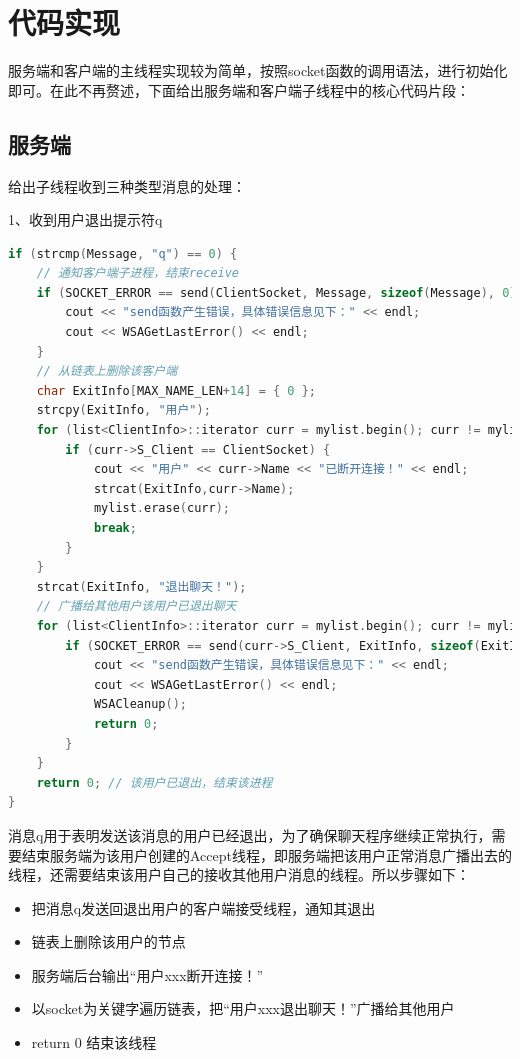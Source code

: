 \documentclass[UTF8,a4paper,10pt]{ctexart}
\begin{document}
\section{代码实现}
服务端和客户端的主线程实现较为简单，按照socket函数的调用语法，进行初始化即可。在此不再赘述，下面给出服务端和客户端子线程中的核心代码片段：
\subsection{服务端}
给出子线程收到三种类型消息的处理：\par
1、收到用户退出提示符q
\begin{lstlisting}[frame=trbl,language={C++}]
if (strcmp(Message, "q") == 0) {
    // 通知客户端子进程，结束receive
    if (SOCKET_ERROR == send(ClientSocket, Message, sizeof(Message), 0)) {
        cout << "send函数产生错误，具体错误信息见下：" << endl;
        cout << WSAGetLastError() << endl;
    }
    // 从链表上删除该客户端
    char ExitInfo[MAX_NAME_LEN+14] = { 0 };
    strcpy(ExitInfo, "用户");
    for (list<ClientInfo>::iterator curr = mylist.begin(); curr != mylist.end(); curr++) {
        if (curr->S_Client == ClientSocket) {
            cout << "用户" << curr->Name << "已断开连接！" << endl;
            strcat(ExitInfo,curr->Name);
            mylist.erase(curr);
            break;
        }
    }
    strcat(ExitInfo, "退出聊天！");
    // 广播给其他用户该用户已退出聊天
    for (list<ClientInfo>::iterator curr = mylist.begin(); curr != mylist.end(); curr++) {
        if (SOCKET_ERROR == send(curr->S_Client, ExitInfo, sizeof(ExitInfo), 0)) {
            cout << "send函数产生错误，具体错误信息见下：" << endl;
            cout << WSAGetLastError() << endl;
            WSACleanup();
            return 0;
        }
    }
    return 0; // 该用户已退出，结束该进程
}
\end{lstlisting}\par
消息q用于表明发送该消息的用户已经退出，为了确保聊天程序继续正常执行，需要结束服务端为该用户创建的Accept线程，即服务端把该用户正常消息广播出去的线程，还需要结束该用户自己的接收其他用户消息的线程。所以步骤如下：
\begin{itemize}
\item 把消息q发送回退出用户的客户端接受线程，通知其退出
\item 链表上删除该用户的节点
\item 服务端后台输出“用户xxx断开连接！”
\item 以socket为关键字遍历链表，把“用户xxx退出聊天！”广播给其他用户
\item return 0 结束该线程
\end{itemize}
\end{document}
